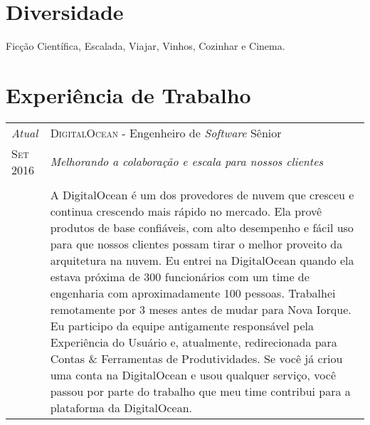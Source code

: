 \documentclass[letter,10pt]{article}
\begin{document}
\section{Diversidade}

Ficção Científica, Escalada, Viajar, Vinhos, Cozinhar e Cinema.

\section{Experiência de Trabalho}

\begin{tabular}{p{2.5cm}|p{13.5cm}}
  \emph{Atual} & \textsc{DigitalOcean} - Engenheiro de \textit{Software} Sênior\\
  \textsc{Set 2016}& \emph{Melhorando a colaboração e escala para nossos clientes}\\
  &\\
  &A DigitalOcean é um dos provedores de nuvem que cresceu e continua crescendo mais rápido no mercado. Ela provê produtos de base confiáveis, com alto desempenho e fácil uso para que nossos clientes possam tirar o melhor proveito da arquitetura na nuvem. Eu entrei na DigitalOcean quando ela estava próxima de 300 funcionários com um time de engenharia com aproximadamente 100 pessoas. Trabalhei remotamente por 3 meses antes de mudar para Nova Iorque. Eu participo da equipe antigamente responsável pela Experiência do Usuário e, atualmente, redirecionada para Contas \& Ferramentas de Produtividades. Se você já criou uma conta na DigitalOcean e usou qualquer serviço, você passou por parte do trabalho que meu time contribui para a plataforma da DigitalOcean.
\end{tabular}
\end{document}
